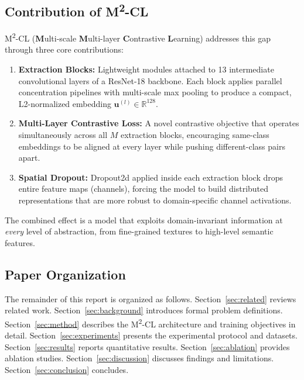 \documentclass[12pt,a4paper]{article}
\begin{document}
\subsection{Contribution of M\textsuperscript{2}-CL}

M\textsuperscript{2}-CL (\textbf{M}ulti-scale \textbf{M}ulti-layer \textbf{C}ontrastive
\textbf{L}earning) addresses this gap through three core contributions:

\begin{enumerate}[leftmargin=2em]
  \item \textbf{Extraction Blocks:} Lightweight modules attached to 13 intermediate
  convolutional layers of a ResNet-18 backbone. Each block applies parallel
  concentration pipelines with multi-scale max pooling to produce a compact,
  L2-normalized embedding $\mathbf{u}^{(l)} \in \mathbb{R}^{128}$.

  \item \textbf{Multi-Layer Contrastive Loss:} A novel contrastive objective that
  operates simultaneously across all $M$ extraction blocks, encouraging same-class
  embeddings to be aligned at every layer while pushing different-class pairs apart.

  \item \textbf{Spatial Dropout:} Dropout2d applied inside each extraction block drops
  entire feature maps (channels), forcing the model to build distributed representations
  that are more robust to domain-specific channel activations.
\end{enumerate}

The combined effect is a model that exploits domain-invariant information at \emph{every}
level of abstraction, from fine-grained textures to high-level semantic features.

\subsection{Paper Organization}

The remainder of this report is organized as follows. Section~\ref{sec:related} reviews
related work. Section~\ref{sec:background} introduces formal problem definitions.
Section~\ref{sec:method} describes the M\textsuperscript{2}-CL architecture and training
objectives in detail. Section~\ref{sec:experiments} presents the experimental protocol
and datasets. Section~\ref{sec:results} reports quantitative results. Section~\ref{sec:ablation}
provides ablation studies. Section~\ref{sec:discussion} discusses findings and limitations.
Section~\ref{sec:conclusion} concludes.
\end{document}
